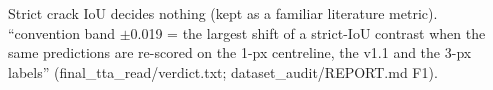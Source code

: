 \begin{table}[htbp]
\begin{tabular}
\bottomrule
\end{tabular}
\par\smallskip
\begin{minipage}{\linewidth}\scriptsize\raggedright
Strict crack IoU decides nothing (kept as a familiar literature metric). ``convention band $\pm$0.019 = the largest shift of a strict-IoU contrast when the same predictions are re-scored on the 1-px centreline, the v1.1 and the 3-px labels'' (final\_\allowbreak{}tta\_\allowbreak{}read/\allowbreak{}verdict.txt; dataset\_\allowbreak{}audit/\allowbreak{}REPORT.md F1).\par
\end{minipage}
\end{table}

\clearpage
\begingroup
\footnotesize
\setlength{\tabcolsep}{3pt}
\setlength{\LTcapwidth}{\linewidth}
